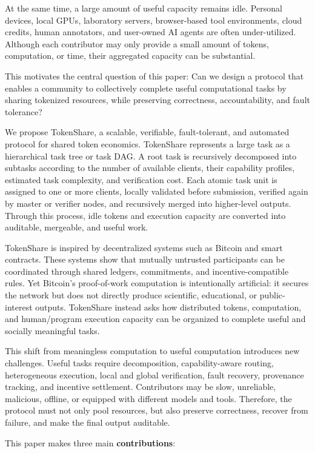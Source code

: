 \documentclass{article}
\theoremstyle{plain}
\begin{document}
At the same time, a large amount of useful capacity remains idle. Personal devices, local GPUs, laboratory servers, browser-based tool environments, cloud credits, human annotators, and user-owned AI agents are often under-utilized. Although each contributor may only provide a small amount of tokens, computation, or time, their aggregated capacity can be substantial.

This motivates the central question of this paper: Can we design a protocol that enables a community to collectively complete useful computational tasks by sharing tokenized resources, while preserving correctness, accountability, and fault tolerance?

We propose TokenShare, a scalable, verifiable, fault-tolerant, and automated protocol for shared token economics. TokenShare represents a large task as a hierarchical task tree or task DAG. A root task is recursively decomposed into subtasks according to the number of available clients, their capability profiles, estimated task complexity, and verification cost. Each atomic task unit is assigned to one or more clients, locally validated before submission, verified again by master or verifier nodes, and recursively merged into higher-level outputs. Through this process, idle tokens and execution capacity are converted into auditable, mergeable, and useful work.

TokenShare is inspired by decentralized systems such as Bitcoin and smart contracts. These systems show that mutually untrusted participants can be coordinated through shared ledgers, commitments, and incentive-compatible rules. Yet Bitcoin’s proof-of-work computation is intentionally artificial: it secures the network but does not directly produce scientific, educational, or public-interest outputs. TokenShare instead asks how distributed tokens, computation, and human/program execution capacity can be organized to complete useful and socially meaningful tasks.

This shift from meaningless computation to useful computation introduces new challenges. Useful tasks require decomposition, capability-aware routing, heterogeneous execution, local and global verification, fault recovery, provenance tracking, and incentive settlement. Contributors may be slow, unreliable, malicious, offline, or equipped with different models and tools. Therefore, the protocol must not only pool resources, but also preserve correctness, recover from failure, and make the final output auditable.

This paper makes three main \textbf{contributions}:
\end{document}
